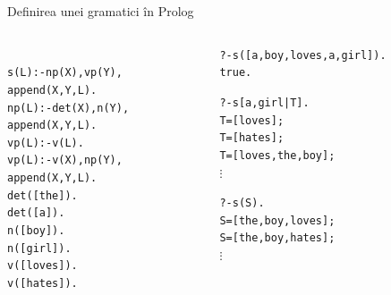 \documentclass[xcolor=x11names,compress,10pt]{beamer}
\begin{document}
\begin{frame}{Definirea unei gramatici în Prolog}
\vspace*{0.3cm}

\begin{columns}
\begin{column}{0.45\textwidth}
\begin{alltt}
{
s(L) :- np(X), vp(Y),\\
\hspace*{1.4cm}  append(X,Y,L).\\

np(L) :- det(X), n(Y), \\
\hspace*{1.6cm} append(X,Y,L) .\\

vp(L) :- v(L).\\
vp(L):- v(X), np(Y),\\
\hspace*{1.4cm} append(X,Y,L) .\\

det([the]).\\ det([a]).\\
n([boy]). \\ n([girl]). \\
v([loves]).\\  v([hates]).}
\end{alltt}
\end{column}
\begin{column}{0.45\textwidth}
\begin{alltt}
?- s([a,boy,loves, a, girl]).\\
true .\\
\medskip

?- s[a, girl|T].\\
T = [loves] ;\\
T = [hates] ;\\
T = [loves, the, boy] ;\\
$\vdots$
\medskip

?- s(S).\\
S = [the, boy, loves] ;\\
S = [the, boy, hates] ;\\
$\vdots$
\end{alltt}
\end{column}
\end{columns}

\end{frame}
\end{document}
